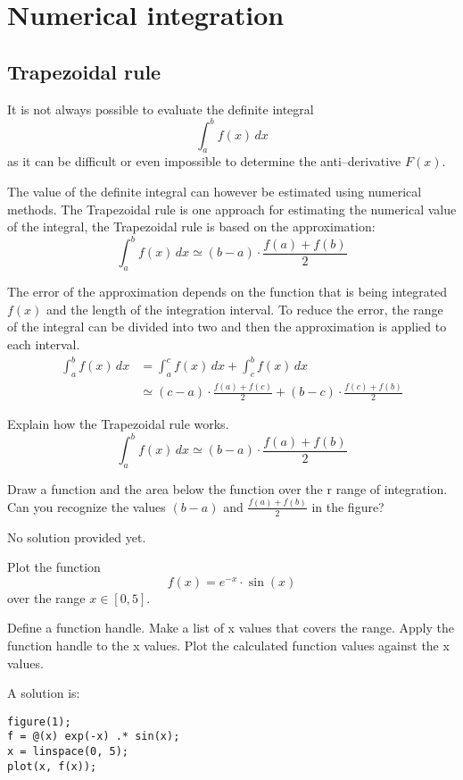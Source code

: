 \section{Numerical integration}

\subsection{Trapezoidal rule}
It is not always possible to evaluate the definite integral
\[
\int_a^b f(x) \, dx
\]
as it can be difficult or even impossible to determine the 
anti--derivative $F(x)$.

The value of the definite integral can however be estimated
using numerical methods.
The Trapezoidal rule is one approach for estimating the 
numerical value of the integral, the Trapezoidal rule 
is based on the approximation:
\[
\int_a^b f(x) \, dx \simeq (b - a) \cdot \frac{f(a) + f(b)}{2}
\]

The error of the approximation depends on the function that 
is being integrated $f(x)$ and the length of the integration 
interval.
To reduce the error, the range of the integral can be divided 
into two and then the approximation is applied to each interval.
\begin{align*}
\int_a^b f(x) \, dx 
& = \int_a^c f(x) \, dx + \int_c^b f(x) \, dx \\
& \simeq (c - a) \cdot \frac{f(a) + f(c)}{2} + (b - c) \cdot \frac{f(c) + f(b)}{2}
\end{align*}


\begin{ex}
Explain how the Trapezoidal rule works.
\[
\int_a^b f(x) \, dx \simeq (b - a) \cdot \frac{f(a) + f(b)}{2}
\]
\begin{hint}
Draw a function and the area below the function over the r
range of integration.
Can you recognize the values $(b - a)$ and $\frac{f(a) + f(b)}{2}$
in the figure?
\end{hint}
\begin{sol}
No solution provided yet.
\end{sol}
\end{ex}

\begin{ex}
Plot the function 
\[
f(x) = e^{-x} \cdot \sin(x)
\]
over the range $x \in [0, 5]$.
\begin{hint}
Define a function handle.
Make a list of x values that covers the range.
Apply the function handle to the x values.
Plot the calculated function values against the x values.
\end{hint}
\begin{sol}
A solution is:
\begin{lstlisting}
figure(1);
f = @(x) exp(-x) .* sin(x);
x = linspace(0, 5);
plot(x, f(x));
\end{lstlisting}
\end{sol}
\end{ex}


